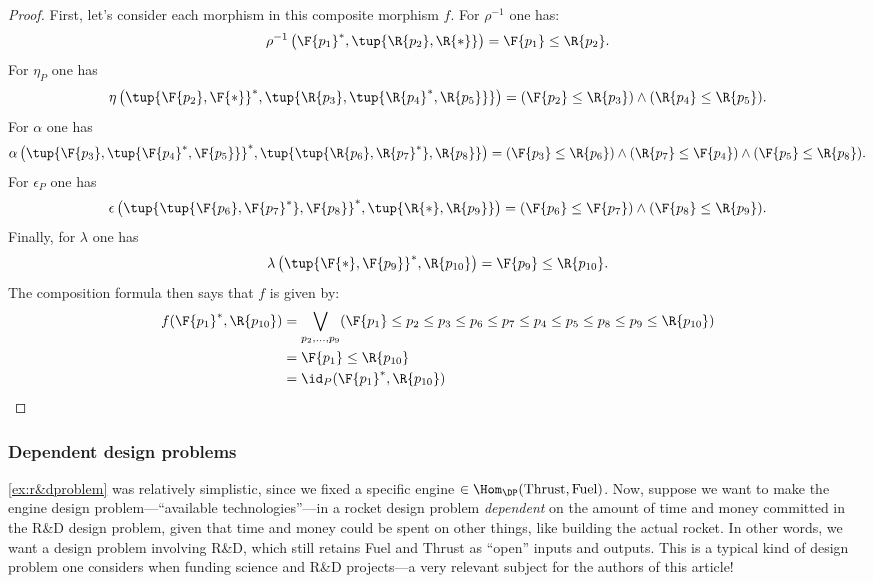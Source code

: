 {\begin{proof}
First, let's consider each morphism in this composite morphism $f$. For $\rho^{-1}$ one has:
\begin{equation}
	\rho^{-1}\left(\F{p_1}^*,\tup{\R{p_2},\R{*}}\right)=\F{p_1}\leq \R{p_2}.
\end{equation}
For $\eta_P$ one has
\begin{equation}
    	\eta\left(\tup{\F{p_2},\F{*}}^*,\tup{\R{p_3},\tup{\R{p_4}^*,\R{p_5}}}\right)=(\F{p_2}\leq \R{p_3})\wedge(\R{p_4}\leq \R{p_5}).
\end{equation}
For $\alpha$ one has
\begin{equation}
    \alpha\left( \tup{\F{p_3},\tup{\F{p_4}^*,\F{p_5}}}^*,\tup{\tup{\R{p_6},\R{p_7}^*},\R{p_8}}\right)=(\F{p_3}\leq \R{p_6})\wedge(\R{p_7}\leq \F{p_4})\wedge(\F{p_5}\leq \R{p_8}).
\end{equation}
For $\epsilon_P$ one has
\begin{equation}
    \epsilon\left(\tup{\tup{\F{p_6},\F{p_7}^*},\F{p_8}}^*,\tup{\R{*},\R{p_9}}\right)=(\F{p_6}\leq \F{p_7})\wedge (\F{p_8}\leq \R{p_9}).
\end{equation}
Finally, for $\lambda$ one has
\begin{equation}
    \lambda\left(\tup{\F{*},\F{p_9}}^*,\R{p_{10}}\right)=\F{p_9}\leq \R{p_{10}}.
\end{equation}
The composition formula then says that $f$ is given by:
\begin{equation}
    \begin{aligned}
    f(\F{p_1}^*,\R{p_{10}})&=\bigvee_{p_2,\ldots,p_9} (\F{p_1}\leq p_2\leq p_3\leq p_6\leq p_7\leq p_4\leq p_5\leq p_8\leq p_9\leq \R{p_{10}})\\
    &=\F{p_1}\leq \R{p_{10}}\\
    &=\id_P(\F{p_1}^*,\R{p_{10}})
    \end{aligned}
\end{equation}
\end{proof}}
\subsubsection*{Dependent design problems}
\cref{ex:r&dproblem} was relatively simplistic, since we fixed a specific engine $\in \Hom_\DP(\text{Thrust}, \text{Fuel})$. Now, suppose we want to make the engine design problem---``available technologies''---in a rocket design problem \emph{dependent} on the amount of time and money committed in the R\&D design problem, given that time and money could be spent on other things, like building the actual rocket. In other words, we want a design problem involving R\&D, which still retains Fuel and Thrust as ``open'' inputs and outputs. This is a typical kind of design problem one considers when funding science and R\&D projects---a very relevant subject for the authors of this article!

